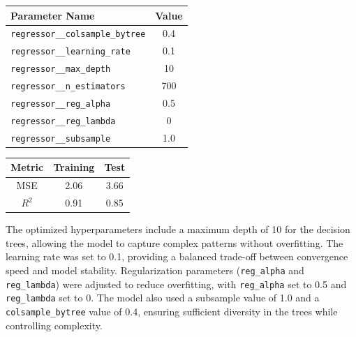 \begin{minipage}[t]{0.48\textwidth}
	\centering
	\renewcommand{\arraystretch}{1} %
	\setlength{\tabcolsep}{8pt} %
	\begin{tabular}{|l|c|}
		\hline
		\textbf{Parameter Name}                 & \textbf{Value} \\
		\hline
		\texttt{regressor\_\_colsample\_bytree} & 0.4            \\
		\hline
		\texttt{regressor\_\_learning\_rate}    & 0.1            \\
		\hline
		\texttt{regressor\_\_max\_depth}        & 10             \\
		\hline
		\texttt{regressor\_\_n\_estimators}     & 700            \\
		\hline
		\texttt{regressor\_\_reg\_alpha}        & 0.5            \\
		\hline
		\texttt{regressor\_\_reg\_lambda}       & 0              \\
		\hline
		\texttt{regressor\_\_subsample}         & 1.0            \\
		\hline
	\end{tabular}
\end{minipage}%
\hfill
\begin{minipage}[t]{0.48\textwidth}
	\centering
	\renewcommand{\arraystretch}{1} %
	\setlength{\tabcolsep}{10pt} %
	\begin{tabular}{|c|c|c|}
		\hline
		\textbf{Metric} & \textbf{Training} & \textbf{Test} \\
		\hline
		MSE             & 2.06              & 3.66          \\
		\hline
		$R^{2}$         & 0.91              & 0.85          \\
		\hline
	\end{tabular}
\end{minipage}

The optimized hyperparameters include a maximum depth of 10 for the decision
trees, allowing the model to capture complex patterns without overfitting. The
learning rate was set to 0.1, providing a balanced trade-off between convergence
speed and model stability. Regularization parameters (\texttt{reg\_alpha} and
\texttt{reg\_lambda}) were adjusted to reduce overfitting, with \texttt{reg\_alpha}
set to 0.5 and \texttt{reg\_lambda} set to 0. The model also used a subsample value
of 1.0 and a \texttt{colsample\_bytree} value of 0.4, ensuring sufficient diversity
in the trees while controlling complexity.

